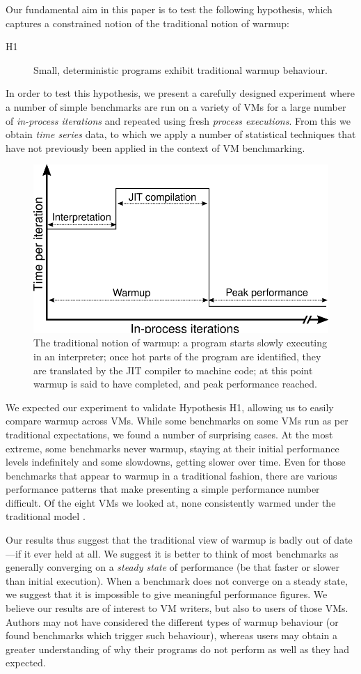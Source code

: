 \documentclass[a4paper,UKenglish]{lipics}
\newcommand{\hypone}{H1\xspace}
\begin{document}
Our fundamental aim in this paper is to test the following hypothesis, which captures a constrained
notion of the traditional notion of warmup:
\begin{description}
  \item[\hypone] Small, deterministic programs exhibit traditional warmup behaviour.
\end{description}
In order to test this hypothesis, we present a carefully designed
experiment where a number of simple benchmarks are run on a variety of
VMs for a large number of \emph{in-process iterations} and repeated using fresh
\emph{process executions}. From this we obtain \emph{time series} data, to which we apply a
number of statistical techniques that have not previously been applied
in the context of VM benchmarking.

\begin{figure}[t]
\centering
\includegraphics[width=.5\textwidth]{img/picturebook_warmup}
\caption{The traditional notion of warmup: a program starts slowly executing in
an interpreter; once hot parts of the program are identified, they are
translated by the JIT compiler to machine code; at this point warmup
is said to have completed, and peak performance reached.}
\label{fig:trad}
\end{figure}

We expected our experiment to validate Hypothesis H1, allowing us to
easily compare warmup across VMs. While some benchmarks on some VMs run as per
traditional expectations, we found a number of surprising cases. At
the most extreme, some benchmarks never warmup, staying at their initial performance
levels indefinitely and some slowdowns, getting slower over time. Even for
those benchmarks that appear to warmup in a traditional fashion, there are
various performance patterns that make presenting a simple performance number
difficult. Of the eight VMs we looked at,
none consistently warmed under the traditional model .

Our results thus suggest that the traditional view of warmup is badly out of
date---if it ever held at all. We suggest it is better to think of most benchmarks as
generally converging on a \emph{steady state} of performance (be that faster or
slower than initial execution). When a benchmark does not converge on a steady
state, we suggest that it is impossible to give meaningful performance figures.
We believe our results are of interest to VM writers, but also to users of
those VMs. Authors may not have considered the different types of warmup
behaviour (or found benchmarks which trigger such behaviour), whereas users may
obtain a greater understanding of why their programs do not perform as well as
they had expected.
\end{document}
